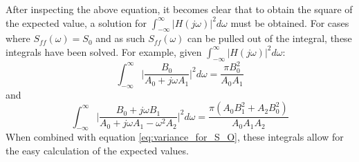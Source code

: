 \documentclass[12pt,letter]{article}
\begin{document}
After inspecting the above equation, it becomes clear that to obtain the square of the expected value, a solution for  $\int_{-\infty}^{\infty} |H(j\omega)|^2 d\omega$ must be obtained. For cases where $S_{ff}(\omega) = S_0$ and as such $S_{ff}(\omega)$ can be pulled out of the integral, these integrals have been solved\protect\footnotemark[1]. For example, given $\int_{-\infty}^{\infty} |H(j\omega)|^2 d\omega$:
\begin{equation}
\int_{-\infty}^{\infty} \bigg|\frac{B_0}{A_0+j \omega A_1} \bigg|^2 d\omega = \frac{\pi B_0^2}{A_0 A_1}
\end{equation} 
and
\begin{equation}
\int_{-\infty}^{\infty} \bigg|\frac{B_0 + j \omega B_1}{A_0+j \omega A_1 - \omega^2 A_2} \bigg|^2 d\omega = \frac{\pi (A_0 B_1^2 + A_2 B_0^2)}{A_0 A_1 A_2}
\end{equation} 
When combined with equation \ref{eq:variance_for_S_O}, these integrals allow for the easy calculation of the expected values. 


	
\end{document}
